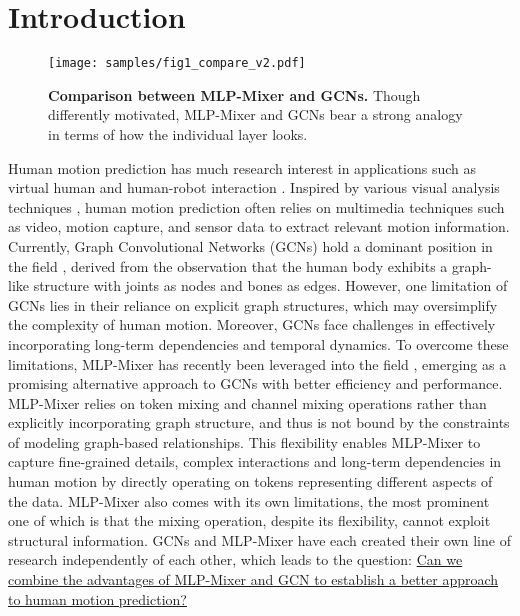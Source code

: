\documentclass[10pt,twocolumn,letterpaper]{article}
\begin{document}
\section{Introduction}

\begin{figure}[t]
\centering
\texttt{[image: samples/fig1\_compare\_v2.pdf]} \caption{
\textbf{Comparison between MLP-Mixer and GCNs.}
Though differently motivated, MLP-Mixer and GCNs bear a strong analogy in terms of how the individual layer looks.
}
\label{fig1 comparison}
\vspace{-1em}
\end{figure}

    Human motion prediction has much research interest in applications such as virtual human and human-robot interaction \cite{schwind2020effects,unhelkar2018human,von2018recovering}.
    Inspired by various visual analysis techniques \cite{zhang2012imageadmixture,zhang2018detecting,tu2023consistent,tu2022general,tu2023dtcm}, human motion prediction often relies on multimedia techniques such as video, motion capture, and sensor data to extract relevant motion information.
Currently, Graph Convolutional Networks (GCNs) \cite{kipf2016semi} hold a dominant position in the field \cite{mao2019learning,mao2021multi,ma2022progressively,li2020dynamic,sofianos2021space,chen2021cyclemlp,tang2022image}, derived from the observation that the human body exhibits a graph-like structure with joints as nodes and bones as edges.
However, one limitation of GCNs lies in their reliance on explicit graph structures, which may oversimplify the complexity of human motion. 
    Moreover, GCNs face challenges in effectively incorporating long-term dependencies and temporal dynamics.
To overcome these limitations, MLP-Mixer \cite{tolstikhin2021mlp} has recently been leveraged into the field \cite{bouazizi2022motionmixer,guo2023back}, emerging as a promising alternative approach to GCNs with better efficiency and performance.
MLP-Mixer relies on token mixing and channel mixing operations rather than explicitly incorporating graph structure, and thus is not bound by the constraints of modeling graph-based relationships. This flexibility enables MLP-Mixer to capture fine-grained details, complex interactions and long-term dependencies in human motion by directly operating on tokens representing different aspects of the data.
MLP-Mixer also comes with its own limitations, the most prominent one of which is that the mixing operation, despite its flexibility, cannot exploit structural information.
GCNs and MLP-Mixer have each created their own line of research independently of each other, which leads to the question: \ul{Can we combine the advantages of MLP-Mixer and GCN to establish a better approach to human motion prediction?}
\end{document}
